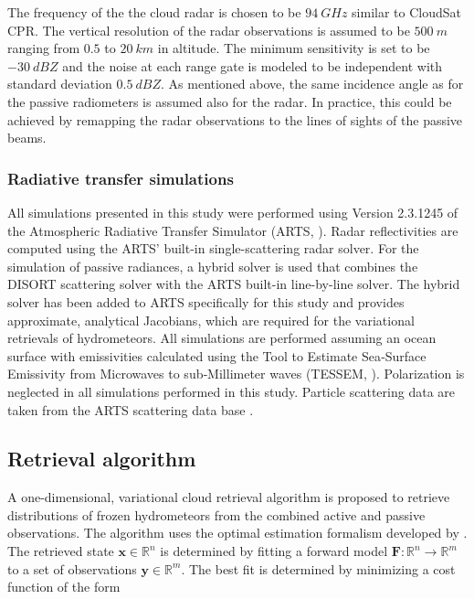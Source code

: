 \documentclass[journal abbreviation, manuscript]{copernicus}
\begin{document}
The frequency of the the cloud radar is chosen to be $94\ \unit{GHz}$ similar to
CloudSat CPR. The vertical resolution of the radar observations is assumed to be
$500\ \unit{m}$ ranging from $0.5$ to $20\ \unit{km}$ in altitude. The minimum
sensitivity is set to be $-30\ \unit{dBZ}$ and the noise at each range gate is
modeled to be independent with standard deviation $0.5\ \unit{dBZ}$. As mentioned
above, the same incidence angle as for the passive radiometers is assumed also
for the radar. In practice, this could be achieved by remapping the radar
observations to the lines of sights of the passive beams.

\subsubsection{Radiative transfer simulations}
\label{sec:orge741b86}

All simulations presented in this study were performed using Version 2.3.1245 of
the Atmospheric Radiative Transfer Simulator (ARTS, \cite{arts18}). Radar
reflectivities are computed using the ARTS' built-in single-scattering radar
solver. For the simulation of passive radiances, a hybrid solver is used that
combines the DISORT scattering solver with the ARTS built-in line-by-line
solver. The hybrid solver has been added to ARTS specifically for this study and
provides approximate, analytical Jacobians, which are required for the
variational retrievals of hydrometeors. All simulations are performed assuming
an ocean surface with emissivities calculated using the Tool to Estimate
Sea‐Surface Emissivity from Microwaves to sub‐Millimeter waves (TESSEM,
\cite{prigent16}). Polarization is neglected in all simulations performed in
this study. Particle scattering data are taken from the ARTS scattering data
base
\citep{eriksson18}.

\subsection{Retrieval algorithm}
\label{sec:orgb528563}

A one-dimensional, variational cloud retrieval algorithm is proposed to
retrieve distributions of frozen hydrometeors from the combined active and
passive observations. The algorithm uses the optimal estimation formalism
developed by \cite{rodgers00}. The retrieved state $\mathbf{x} \in
   \mathbb{R}^n$ is determined by fitting a forward model $\mathbf{F} : \mathbb{R}^n
   \rightarrow \mathbb{R}^m$ to a set of observations $\mathbf{y} \in
   \mathbb{R}^m$. The best fit is determined by minimizing a cost function of
the form
\end{document}
